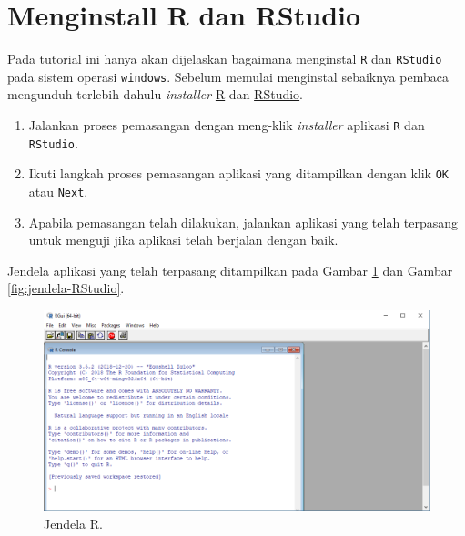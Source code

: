 \documentclass[]{book}
\providecommand{\tightlist}{%
  \setlength{\itemsep}{0pt}\setlength{\parskip}{0pt}}
\theoremstyle{definition}
\theoremstyle{definition}
\theoremstyle{definition}
\theoremstyle{remark}
\begin{document}
\hypertarget{installR}{%
\section{Menginstall R dan RStudio}\label{installR}}

Pada tutorial ini hanya akan dijelaskan bagaimana menginstal \texttt{R} dan \texttt{RStudio} pada sistem operasi \texttt{windows}. Sebelum memulai menginstal sebaiknya pembaca mengunduh terlebih dahulu \emph{installer} \href{https://cran.r-project.org/bin/windows/base/}{R} dan \href{https://www.rstudio.com/products/rstudio/download/}{RStudio}.

\begin{enumerate}
\def\labelenumi{\arabic{enumi}.}
\tightlist
\item
  Jalankan proses pemasangan dengan meng-klik \emph{installer} aplikasi \texttt{R} dan \texttt{RStudio}.
\item
  Ikuti langkah proses pemasangan aplikasi yang ditampilkan dengan klik \texttt{OK} atau \texttt{Next}.
\item
  Apabila pemasangan telah dilakukan, jalankan aplikasi yang telah terpasang untuk menguji jika aplikasi telah berjalan dengan baik.
\end{enumerate}

Jendela aplikasi yang telah terpasang ditampilkan pada Gambar \ref{fig:jendela-R} dan Gambar \ref{fig:jendela-RStudio}.

\begin{figure}

{\centering \includegraphics[width=0.8\linewidth]{./images/jendela_r} 

}

\caption{Jendela R.}\label{fig:jendela-R}
\end{figure}
\end{document}
